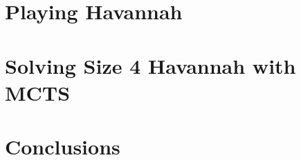 \documentclass[12pt, letterpaper]{report}
\renewcommand{\baselinestretch}{1.33}
\numberwithin{equation}{section}
\begin{document}
  \chapter[Playing Havannah]{\label{playing} \LARGE Playing Havannah }
  

  \chapter[Solving Size 4 Havannah!]{\label{solving} \LARGE Solving Size 4 Havannah with MCTS}
  

  \chapter[Conclusions]{\label{conclusion} \LARGE Conclusions}
  
  
%    
  
  
  \small
  \renewcommand{\baselinestretch}{0.25}
  
\end{document}
